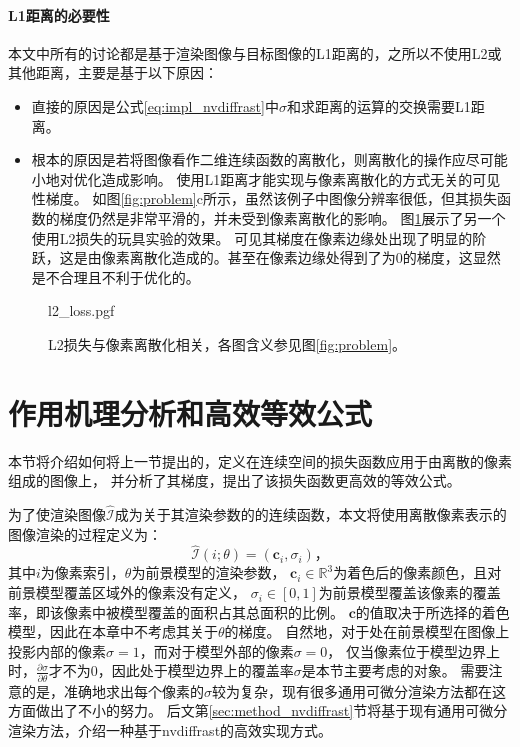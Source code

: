 \paragraph{L1距离的必要性}
本文中所有的讨论都是基于渲染图像与目标图像的L1距离的，之所以不使用L2或其他距离，主要是基于以下原因：
\begin{itemize}
\item 直接的原因是公式\eqref{eq:impl_nvdiffrast}中$\sigma$和求距离的运算的交换需要L1距离。
\item 根本的原因是若将图像看作二维连续函数的离散化，则离散化的操作应尽可能小地对优化造成影响。
使用L1距离才能实现与像素离散化的方式无关的可见性梯度。
如图\ref{fig:problem}c所示，虽然该例子中图像分辨率很低，但其损失函数的梯度仍然是非常平滑的，并未受到像素离散化的影响。
图\ref{fig:l2_loss}展示了另一个使用L2损失的玩具实验的效果。
可见其梯度在像素边缘处出现了明显的阶跃，这是由像素离散化造成的。甚至在像素边缘处得到了为0的梯度，这显然是不合理且不利于优化的。
\end{itemize}

\begin{figure}
    \centering
    {l2_loss.pgf}
    \caption[L2损失与像素离散化相关]{L2损失与像素离散化相关，各图含义参见图\ref{fig:problem}。}
    \label{fig:l2_loss}
\end{figure}

\section{作用机理分析和高效等效公式}

本节将介绍如何将上一节提出的，定义在连续空间的损失函数应用于由离散的像素组成的图像上，
并分析了其梯度，提出了该损失函数更高效的等效公式。

为了使渲染图像$\hat{\mathcal{I}}$成为关于其渲染参数的的连续函数，本文将使用离散像素表示的图像渲染的过程定义为：
\begin{equation}
\hat{\mathcal{I}}(i;\theta) = (\mathbf{c}_i, \sigma_i)
\text{，}
\label{eq:rendering}
\end{equation}
其中$i$为像素索引，$\theta$为前景模型的渲染参数，
$\mathbf{c}_i\in\mathbb{R}^3$为着色后的像素颜色，且对前景模型覆盖区域外的像素没有定义，
$\sigma_i\in[0,1]$为前景模型覆盖该像素的覆盖率，即该像素中被模型覆盖的面积占其总面积的比例。
$\mathbf{c}$的值取决于所选择的着色模型，因此在本章中不考虑其关于$\theta$的梯度。
自然地，对于处在前景模型在图像上投影内部的像素$\sigma=1$，而对于模型外部的像素$\sigma=0$，
仅当像素位于模型边界上时，$\frac{\partial\sigma}{\partial\theta}$才不为0，因此处于模型边界上的覆盖率$\sigma$是本节主要考虑的对象。
需要注意的是，准确地求出每个像素的$\sigma$较为复杂，现有很多通用可微分渲染方法都在这方面做出了不小的努力。
后文第\ref{sec:method_nvdiffrast}节将基于现有通用可微分渲染方法，介绍一种基于nvdiffrast的高效实现方式。

